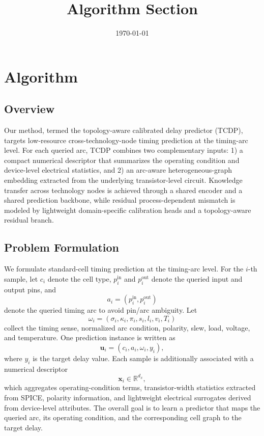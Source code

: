 \documentclass[10pt,a4paper]{article}
\title{Algorithm Section}
\author{}
\date{\today}
\begin{document}
\maketitle

\section{Algorithm}
\label{sec:algorithm}

\subsection{Overview}

Our method, termed the topology-aware calibrated delay predictor (TCDP), targets low-resource cross-technology-node timing prediction at the timing-arc level. For each queried arc, TCDP combines two complementary inputs: 1) a compact numerical descriptor that summarizes the operating condition and device-level electrical statistics, and 2) an arc-aware heterogeneous-graph embedding extracted from the underlying transistor-level circuit. Knowledge transfer across technology nodes is achieved through a shared encoder and a shared prediction backbone, while residual process-dependent mismatch is modeled by lightweight domain-specific calibration heads and a topology-aware residual branch.

\subsection{Problem Formulation}

We formulate standard-cell timing prediction at the timing-arc level. For the $i$-th sample, let $c_i$ denote the cell type, $p_i^{\mathrm{in}}$ and $p_i^{\mathrm{out}}$ denote the queried input and output pins, and
\begin{equation}
    a_i = \left(p_i^{\mathrm{in}}, p_i^{\mathrm{out}}\right)
\end{equation}
denote the queried timing arc to avoid pin/arc ambiguity. Let
\begin{equation}
    \omega_i = \left(\sigma_i, \kappa_i, \pi_i, s_i, l_i, v_i, T_i\right)
\end{equation}
collect the timing sense, normalized arc condition, polarity, slew, load, voltage, and temperature. One prediction instance is written as
\begin{equation}
    \mathbf{u}_i = \left(c_i, a_i, \omega_i, y_i\right),
\end{equation}
where $y_i$ is the target delay value. Each sample is additionally associated with a numerical descriptor
\begin{equation}
    \mathbf{x}_i \in \mathbb{R}^{d_x},
\end{equation}
which aggregates operating-condition terms, transistor-width statistics extracted from SPICE, polarity information, and lightweight electrical surrogates derived from device-level attributes. The overall goal is to learn a predictor that maps the queried arc, its operating condition, and the corresponding cell graph to the target delay.
\end{document}
